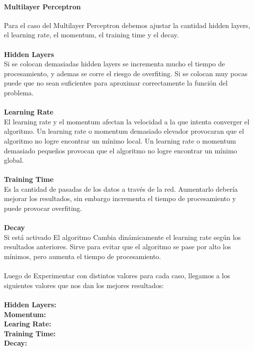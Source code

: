       \paragraph{Multilayer Perceptron}
          Para el caso del Multilayer Perceptron debemos ajustar la cantidad
          hidden layers, el learning rate, el momentum, el training time y el
          decay.\\\\
          \textbf{Hidden Layers\\}
          Si se colocan demasiadas hidden layers se incrementa mucho el tiempo
          de procesamiento, y ademas se corre el riesgo de overfiting. Si se
          colocan muy pocas puede que no sean suficientes para aproximar
          correctamente la función del problema.\\\\
          \textbf{Learning Rate\\}
          El learning rate y el momentum afectan la velocidad a la que intenta
          converger el algoritmo. Un learning rate o momentum demasiado elevador
          provocaran que el algoritmo no logre encontrar un mínimo local. Un
          learning rate o momentum demasiado pequeños provocan que el algoritmo
          no logre encontrar un mínimo global.\\\\
          \textbf{Training Time\\}
          Es la cantidad de pasadas de los datos a través de la red. Aumentarlo
          debería mejorar los resultados, sin embargo incrementa el tiempo de
          procesamiento y puede provocar overfiting.\\\\
          \textbf{Decay\\}
          Si está activado El algoritmo Cambia dinámicamente el learning rate
          según los resultados anteriores. Sirve para evitar que el algoritmo
          se pase por alto los mínimos, pero aumenta el tiempo de
          procesamiento.\\\\
          Luego de Experimentar con distintos valores para cada caso, llegamos a
          los siguientes valores que nos dan los mejores resultados:\\\\
          \textbf{Hidden Layers:}\\
          \textbf{Momentum:}\\
          \textbf{Learing Rate:}\\
          \textbf{Training Time:}\\
          \textbf{Decay:}\\

